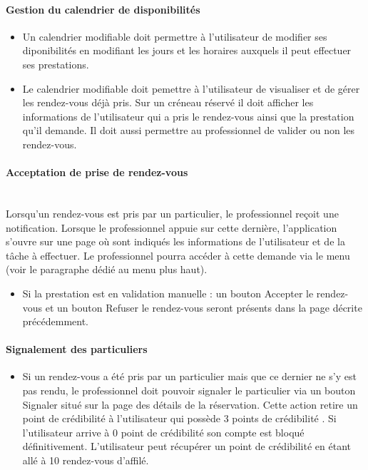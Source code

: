 \documentclass{article}
\begin{document}
\paragraph{Gestion du calendrier de disponibilités}
\begin{itemize}
\item Un calendrier modifiable doit permettre à l'utilisateur de
  modifier ses diponibilités en modifiant les jours et les horaires
  auxquels il peut effectuer ses prestations.
\item Le calendrier modifiable doit pemettre à l'utilisateur de
  visualiser et de gérer les rendez-vous déjà pris. Sur un créneau
  réservé il doit afficher les informations de l'utilisateur qui a pris
  le rendez-vous ainsi que la prestation qu'il demande. Il doit aussi permettre au professionnel de valider
  ou non les rendez-vous.
\end{itemize}
\paragraph{Acceptation de prise de rendez-vous}
~~\\

Lorsqu'un rendez-vous est pris par un particulier, le
  professionnel reçoit une notification. Lorsque le professionnel
  appuie sur cette dernière, l'application s'ouvre sur une page où sont
  indiqués les informations de l'utilisateur et de la tâche à effectuer.
  Le professionnel pourra accéder à cette demande via le menu (voir le paragraphe dédié au menu plus haut).
\begin{itemize}
\item  Si la prestation est en validation manuelle : un bouton \og
  Accepter le rendez-vous \fg{} et un bouton \og
  Refuser le rendez-vous \fg{} seront présents dans la page décrite précédemment.
\end{itemize}
\paragraph{Signalement des particuliers}
\begin{itemize}
\item Si un rendez-vous a été pris par un particulier mais que ce dernier
  ne s'y est pas rendu, le professionnel doit pouvoir
  signaler le particulier via un bouton \og Signaler \fg{} situé
  sur la page des détails de la réservation. 
  Cette action retire un \og point de crédibilité \fg{} à l'utilisateur qui possède
  3 \og points de crédibilité \fg{}. Si l'utilisateur arrive à 0 point de crédibilité son compte est
  bloqué définitivement. L'utilisateur peut récupérer un point de crédibilité  en étant
  allé à 10 rendez-vous d'affilé.
\end{itemize}
\end{document}
